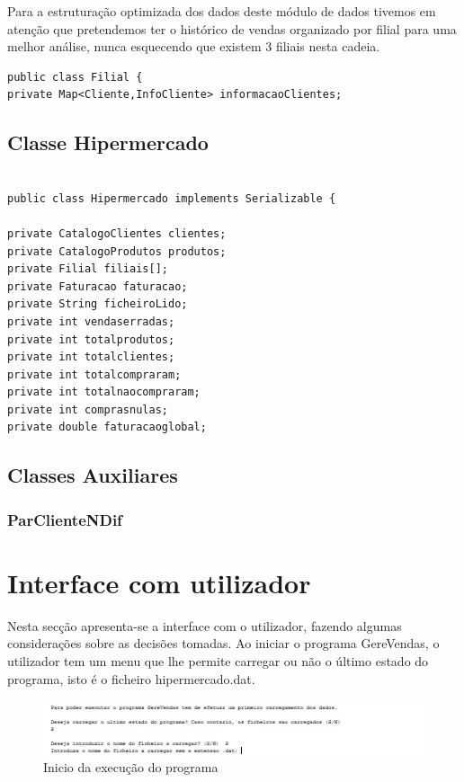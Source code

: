  Para a estruturação optimizada dos dados deste módulo de dados tivemos em atenção que pretendemos ter o histórico de vendas organizado por filial para uma melhor análise, nunca esquecendo que existem 3 filiais nesta cadeia. 


\begin{verbatim}
public class Filial {
private Map<Cliente,InfoCliente> informacaoClientes; 
\end{verbatim}

\section{Classe Hipermercado }

\begin{verbatim}

public class Hipermercado implements Serializable {

private CatalogoClientes clientes;
private CatalogoProdutos produtos;
private Filial filiais[];
private Faturacao faturacao;
private String ficheiroLido;
private int vendaserradas;
private int totalprodutos;
private int totalclientes;
private int totalcompraram;
private int totalnaocompraram;
private int comprasnulas;
private double faturacaoglobal;
\end{verbatim}

\section{Classes Auxiliares}

\subsection{ParClienteNDif}




\chapter{Interface com utilizador}

Nesta secção apresenta-se a interface com o utilizador, fazendo algumas considerações sobre as decisões tomadas.
Ao iniciar o programa GereVendas, o utilizador tem um menu que lhe permite carregar ou não o último estado do programa, isto é o ficheiro hipermercado.dat. 

\begin{figure}[h!]
	\includegraphics[scale=1]{IntroduzirUmFicheiroStream.jpg}  
	\caption{Inicio da execução do programa }  
\end{figure}

